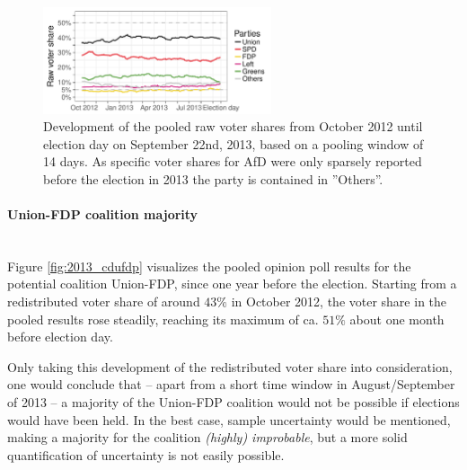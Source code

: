 \documentclass[smallcondensed]{svjour3}     %
\begin{document}
\begin{figure}[H]\centering
\includegraphics[width=0.6\textwidth]{figures/2013_pooled_rawShares.pdf}
\caption{Development of the pooled raw voter shares from October 2012 until election day on September 22nd, 2013, based on a pooling window of 14 days.
As specific voter shares for AfD were only sparsely reported before the election in 2013 the party is contained in ''Others''.
\label{fig:2013}
}
\end{figure}



\paragraph{Union-FDP coalition majority} \ \\
Figure \ref{fig:2013_cdufdp} visualizes the pooled opinion poll results
for the potential coalition Union-FDP, since one year before the election.
Starting from a redistributed voter share of around $43\%$ in October 2012,
the voter share in the pooled results rose steadily, reaching its maximum
of ca. $51\%$ about one month before election day.

Only taking this development of the redistributed voter share into
consideration, one would conclude that -- apart from a short
time window in August/September of 2013 -- a majority of the Union-FDP
coalition would not be possible if elections would have been held.
In the best case, sample uncertainty would be mentioned, making
a majority for the coalition {\it (highly) improbable}, but a more
solid quantification of uncertainty is not easily possible.
\end{document}
